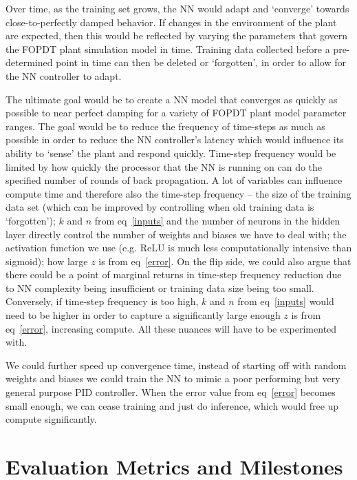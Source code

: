 \documentclass[10pt,twocolumn,letterpaper]{article}
\begin{document}
        Over time, as the training set grows, the NN would adapt and `converge' towards close-to-perfectly damped
        behavior. If changes in the environment of the plant are expected, then this would be reflected by varying the
        parameters that govern the FOPDT plant simulation model in time. Training data collected before a pre-determined
        point in time can then be deleted or `forgotten', in order to allow for the NN controller to adapt.

        The ultimate goal would be to create a NN model that converges as quickly as possible to near perfect damping
        for a variety of FOPDT plant model parameter ranges. The goal would be to reduce the frequency of time-steps as
        much as possible in order to reduce the NN controller's latency which would influence its ability to `sense' the
        plant and respond quickly. Time-step frequency would be limited by how quickly the processor that the NN is
        running on can do the specified number of rounds of back propagation. A lot of variables can influence compute
        time and therefore also the time-step frequency -- the size of the training data set (which can be improved by
        controlling when old training data is `forgotten'); $k$ and $n$ from eq~\ref{inputs} and the number of neurons
        in the hidden layer directly control the number of weights and biases we have to deal with; the activation
        function we use (e.g. ReLU is much less computationally intensive than sigmoid); how large $z$ is from
        eq~\ref{error}. On the flip side, we could also argue that there could be a point of marginal returns in
        time-step frequency reduction due to NN complexity being insufficient or training data size being too small.
        Conversely, if time-step frequency is too high, $k$ and $n$ from eq~\ref{inputs} would need to be higher in
        order to capture a significantly large enough $z$ is from eq~\ref{error}, increasing compute. All these nuances
        will have to be experimented with.

        We could further speed up convergence time, instead of starting off with random weights and biases we could
        train the NN to mimic a poor performing but very general purpose PID controller. When the error value from
        eq~\ref{error} becomes small enough, we can cease training and just do inference, which would free up compute
        significantly. 

    \section{Evaluation Metrics and Milestones} \label{milestones}
\end{document}
